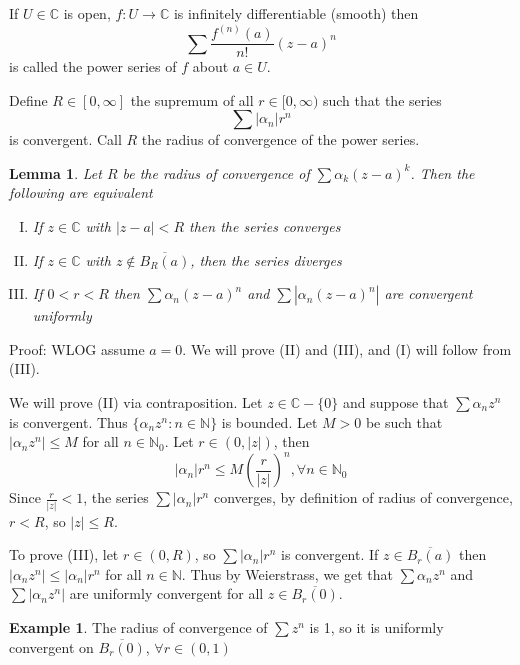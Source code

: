 \documentclass[11pt]{article}
\theoremstyle{plain}
\newtheorem{lemma}[theorem]{Lemma}
\theoremstyle{definition}
\newtheorem{example}[theorem]{Example}
\begin{document}
\vspace{5mm}
\noindent
If $U \in \mathbb{C}$ is open, $f: U \to \mathbb{C}$ is infinitely differentiable (smooth) then 
$$ \sum \frac{f^{(n)}(a)}{n!} (z - a)^n $$
is called the power series of $f$ about $a \in U$.

\vspace{5mm}
\noindent
Define $R \in [0, \infty]$ the supremum of all $r \in [0, \infty)$ such that the series 
$$ \sum |\alpha_n|r^n $$
is convergent. Call $R$ the radius of convergence of the power series.

\begin{lemma}
Let $R$ be the radius of convergence of $\sum \alpha_k (z - a)^k$. Then the following are equivalent
\begin{enumerate}[(I)]
\item If $z \in \mathbb{C}$ with $|z - a| < R$ then the series converges
\item If $z \in \mathbb{C}$ with $z \notin \overline{B_R(a)}$, then the series diverges 
\item If $0 < r < R$ then $\sum \alpha_n (z-a)^n$ and $\sum |\alpha_n(z-a)^n|$ are convergent uniformly 
\end{enumerate}
\end{lemma}

Proof: WLOG assume $a = 0$. We will prove (II) and (III), and (I) will follow from (III).

We will prove (II) via contraposition. Let $z \in \mathbb{C} - \{ 0 \}$ and suppose that $\sum \alpha_n z^n$ is convergent. Thus $\{ \alpha_n z^n : n \in \mathbb{N} \}$ is bounded. Let $M > 0$ be such that $|\alpha_n z^n| \leq M$ for all $n \in \mathbb{N}_0$. Let $r \in (0, |z|)$, then 
$$ |\alpha_n| r^n \leq M\left(\frac{r}{|z|}\right)^n, \forall n \in \mathbb{N}_0 $$
Since $\frac{r}{|z|} < 1$, the series $\sum |\alpha_n|r^n$ converges, by definition of radius of convergence, $r < R$, so $|z| \leq R$.

To prove (III), let $r \in (0, R)$, so $\sum |\alpha_n|r^n$ is convergent. If $z \in \overline{B_r(a)}$ then $|\alpha_n z^n| \leq |\alpha_n| r^n$ for all $n \in \mathbb{N}$. Thus by Weierstrass, we get that $\sum \alpha_n z^n$ and $\sum |\alpha_n z^n|$ are uniformly convergent for all $z \in \overline{B_r(0)}$.

\begin{example}
The radius of convergence of $\sum z^n$ is 1, so it is uniformly convergent on $\overline{B_r(0)}$, $\forall r \in (0, 1)$
\end{example}
\end{document}
